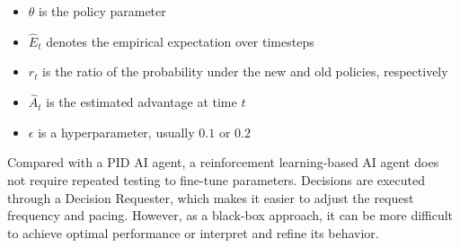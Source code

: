 \begin{itemize}
    \item $\theta$ is the policy parameter
    \item $\hat{E}_t$ denotes the empirical expectation over timesteps
    \item $r_t$ is the ratio of the probability under the new and old policies, respectively
    \item $\hat{A}_t$ is the estimated advantage at time $t$
    \item $\epsilon$ is a hyperparameter, usually $0.1$ or $0.2$
\end{itemize}

Compared with a PID AI agent, a reinforcement learning-based AI agent does not require repeated testing to fine-tune parameters. Decisions are executed through a Decision Requester, which makes it easier to adjust the request frequency and pacing. However, as a black-box approach, it can be more difficult to achieve optimal performance or interpret and refine its behavior.